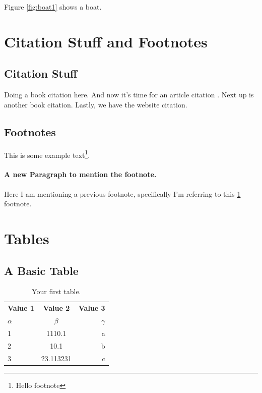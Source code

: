 \documentclass{article}
\begin{document}
    Figure \ref{fig:boat1} shows a boat.

  \section{Citation Stuff and Footnotes}
    \subsection{Citation Stuff}
    Doing a book citation \autocite[31]{BOOK:1} here.
    And now it's time for an article citation \autocite[697]{ARTICLE:1}.
    Next up is another book \autocite[155]{BOOK:2} citation.
    Lastly, we have the website \autocite[]{WEBSITE:1} citation.

    \subsection{Footnotes}
    This is some example text\footnote{\label{myfootnote}Hello footnote}.

    \paragraph{A new Paragraph to mention the footnote.}
    Here I am mentioning a previous footnote, specifically I'm referring to this \ref{myfootnote} footnote.


  \section {Tables}
    \subsection{A Basic Table}
    \begin{table}[h!]
      \begin{center}
        \caption{Your first table.}
        \label{tab:table1}
        \begin{tabular}{l|c|r} %
          \textbf{Value 1} & \textbf{Value 2} & \textbf{Value 3}\\
          $\alpha$ & $\beta$ & $\gamma$ \\
          \hline
          1 & 1110.1 & a\\
          2 & 10.1 & b\\
          3 & 23.113231 & c\\
        \end{tabular}
      \end{center}
    \end{table}
\end{document}
